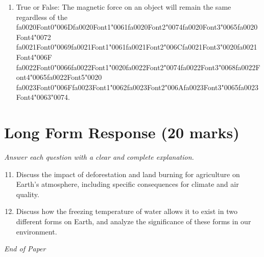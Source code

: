 \documentclass[12pt]{article}
\begin{document}
\begin{enumerate}[label=\arabic*.]
\item True or False: The magnetic force on an object will remain the same regardless of the {\csname fa0020Font0\endcsname\char"006D}{\csname fa0020Font1\endcsname\char"0061}{\csname fa0020Font2\endcsname\char"0074}{\csname fa0020Font3\endcsname\char"0065}{\csname fa0020Font4\endcsname\char"0072} {\csname fa0021Font0\endcsname\char"0069}{\csname fa0021Font1\endcsname\char"0061}{\csname fa0021Font2\endcsname\char"006C}{\csname fa0021Font3\endcsname\char"0020}{\csname fa0021Font4\endcsname\char"006F} {\csname fa0022Font0\endcsname\char"0066}{\csname fa0022Font1\endcsname\char"0020}{\csname fa0022Font2\endcsname\char"0074}{\csname fa0022Font3\endcsname\char"0068}{\csname fa0022Font4\endcsname\char"0065}{\csname fa0022Font5\endcsname\char"0020} {\csname fa0023Font0\endcsname\char"006F}{\csname fa0023Font1\endcsname\char"0062}{\csname fa0023Font2\endcsname\char"006A}{\csname fa0023Font3\endcsname\char"0065}{\csname fa0023Font4\endcsname\char"0063}{\char"0074}.
\end{enumerate}

\section*{Long Form Response (20 marks)}
\textit{Answer each question with a clear and complete explanation.}
\begin{enumerate}[label=\arabic*.]
\setcounter{enumi}{10}
\item Discuss the impact of deforestation and land burning for agriculture on Earth's
atmosphere, including specific consequences for climate and air quality.
\item Discuss how the freezing temperature of water allows it to exist in two different forms on
Earth, and analyze the significance of these forms in our environment.
\end{enumerate}

\vfill
\noindent\textit{End of Paper}
\end{document}
